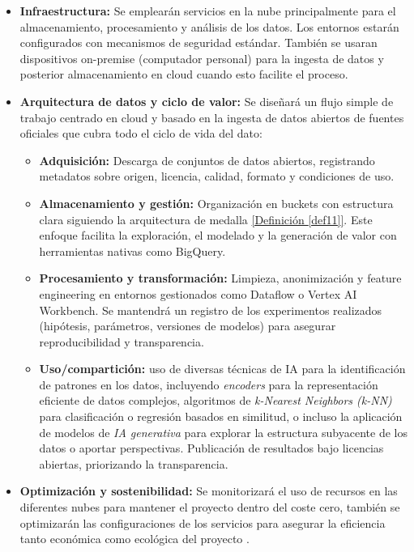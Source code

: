 \begin{itemize}
	\item \textbf{Infraestructura:} Se emplearán servicios en la nube principalmente para el almacenamiento, procesamiento y análisis de los datos. Los entornos estarán configurados con mecanismos de seguridad estándar. También se usaran dispositivos on-premise (computador personal) para la ingesta de datos y posterior almacenamiento en cloud cuando esto facilite el proceso.

	\item \textbf{Arquitectura de datos y ciclo de valor:} Se diseñará un flujo simple de trabajo centrado en cloud y basado en la ingesta de datos abiertos de fuentes oficiales que cubra todo el ciclo de vida del dato: 
	\begin{itemize}
		\item \textbf{Adquisición:} Descarga de conjuntos de datos abiertos, registrando metadatos sobre origen, licencia, calidad, formato y condiciones de uso. 
		
		\item \textbf{Almacenamiento y gestión:} Organización en buckets con estructura clara siguiendo la arquitectura de medalla \hyperref[def11]{[Definición \ref*{def11}]}. Este enfoque facilita la exploración, el modelado y la generación de valor con herramientas nativas como BigQuery.
		
		\item \textbf{Procesamiento y transformación:} Limpieza, anonimización y feature engineering en entornos gestionados como Dataflow o Vertex AI Workbench. Se mantendrá un registro de los experimentos realizados (hipótesis, parámetros, versiones de modelos) para asegurar reproducibilidad y transparencia.
		
		\item \textbf{Uso/compartición:} uso de diversas técnicas de IA para la identificación de patrones en los datos, incluyendo \textit{encoders} para la representación eficiente de datos complejos, algoritmos de \textit{k-Nearest Neighbors (k-NN)} para clasificación o regresión basados en similitud, o incluso la aplicación de modelos de \textit{IA generativa} para explorar la estructura subyacente de los datos o aportar perspectivas. Publicación de resultados bajo licencias abiertas, priorizando la transparencia.
		
	\end{itemize}
	
	\item \textbf{Optimización y sostenibilidad:} Se monitorizará el uso de recursos en las diferentes nubes para mantener el proyecto dentro del coste cero, también se optimizarán las configuraciones de los servicios para asegurar la eficiencia tanto económica como ecológica del proyecto .
\end{itemize}

